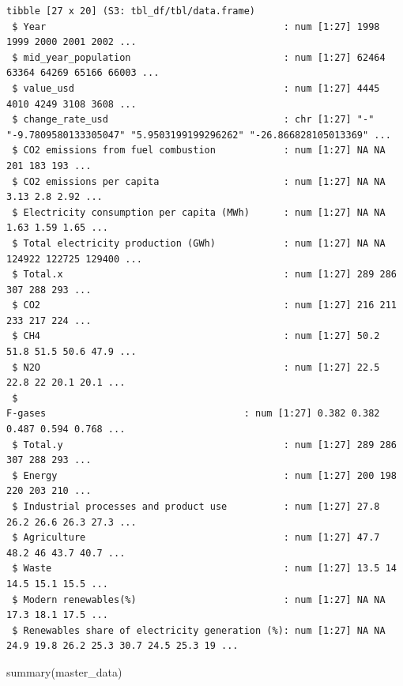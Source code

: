 \documentclass[
  letterpaper,
  DIV=11,
  numbers=noendperiod]{scrartcl}
\newenvironment{Shaded}{\begin{snugshade}}{\end{snugshade}}
\newcommand{\FunctionTok}[1]{\textcolor[rgb]{0.28,0.35,0.67}{#1}}
\newcommand{\NormalTok}[1]{\textcolor[rgb]{0.00,0.23,0.31}{#1}}
\begin{document}
\begin{verbatim}
tibble [27 x 20] (S3: tbl_df/tbl/data.frame)
 $ Year                                          : num [1:27] 1998 1999 2000 2001 2002 ...
 $ mid_year_population                           : num [1:27] 62464 63364 64269 65166 66003 ...
 $ value_usd                                     : num [1:27] 4445 4010 4249 3108 3608 ...
 $ change_rate_usd                               : chr [1:27] "-" "-9.7809580133305047" "5.9503199199296262" "-26.866828105013369" ...
 $ CO2 emissions from fuel combustion            : num [1:27] NA NA 201 183 193 ...
 $ CO2 emissions per capita                      : num [1:27] NA NA 3.13 2.8 2.92 ...
 $ Electricity consumption per capita (MWh)      : num [1:27] NA NA 1.63 1.59 1.65 ...
 $ Total electricity production (GWh)            : num [1:27] NA NA 124922 122725 129400 ...
 $ Total.x                                       : num [1:27] 289 286 307 288 293 ...
 $ CO2                                           : num [1:27] 216 211 233 217 224 ...
 $ CH4                                           : num [1:27] 50.2 51.8 51.5 50.6 47.9 ...
 $ N2O                                           : num [1:27] 22.5 22.8 22 20.1 20.1 ...
 $ 
F-gases                                   : num [1:27] 0.382 0.382 0.487 0.594 0.768 ...
 $ Total.y                                       : num [1:27] 289 286 307 288 293 ...
 $ Energy                                        : num [1:27] 200 198 220 203 210 ...
 $ Industrial processes and product use          : num [1:27] 27.8 26.2 26.6 26.3 27.3 ...
 $ Agriculture                                   : num [1:27] 47.7 48.2 46 43.7 40.7 ...
 $ Waste                                         : num [1:27] 13.5 14 14.5 15.1 15.5 ...
 $ Modern renewables(%)                          : num [1:27] NA NA 17.3 18.1 17.5 ...
 $ Renewables share of electricity generation (%): num [1:27] NA NA 24.9 19.8 26.2 25.3 30.7 24.5 25.3 19 ...
\end{verbatim}

\begin{Shaded}
\begin{Highlighting}[]
\FunctionTok{summary}\NormalTok{(master\_data)}
\end{Highlighting}
\end{Shaded}
\end{document}
